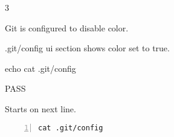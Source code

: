 \begin{description}[align=right,leftmargin=3.2cm,labelindent=3.0cm]
\item[Step:] 3
\item[Confirm:] Git is configured to disable color.
\item[Expectation:] .git/config ui section shows color set to true.
\item[Command:] echo cat  .git/config
\item[Test Result:] PASS
\item[Evidence:] Starts on next line.
\end{description}
\begin{lstlisting}[numbers=left]
cat .git/config

\end{lstlisting}
